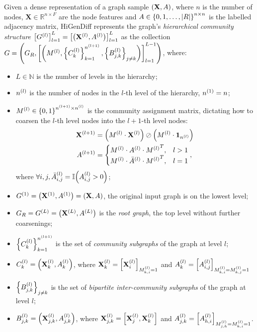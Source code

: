 Given a dense representation of a graph sample $\of{\mathbf{X},A}$, where $n$ is the number of nodes, $\mathbf{X} \in \mathbb{R}^{n \times F}$ are the node features and $A \in \offf{0,1,\dots,\abs{R}}^{n \times n}$ is the labelled adjacency matrix, HiGenDiff represents the graph's \emph{hierarchical community structure} $\off{G^{\of{l}}}_{l=1}^{L}=\off{\of{\mathbf{X}^{\of{l}},A^{\of{l}}}}_{l=1}^{L}$ as the collection $G=\of{G_R,\off{\of{M^{\of{l}}, \offf{C^{\of{l}}_{k}}_{k=1}^{n^{\of{l+1}}},\offf{B^{\of{l}}_{j,k}}_{j \neq k}}}_{l=1}^{L-1}}$, where:
\begin{itemize}
    \item $L \in \mathbb{N}$ is the number of levels in the hierarchy;
    \item $n^{\of{l}}$ is the number of nodes in the $l$-th level of the hierarchy, $n^{\of{1}}=n$;
    \item $M^{\of{l}} \in \offf{0,1}^{n^{\of{l+1}} \times n^{\of{l}}}$ is the community assignment matrix, dictating how to coarsen the $l$-th level nodes into the $l+1$-th level nodes:
    \begin{align}
        \begin{split}
            \mathbf{X}^{\of{l+1}}&=\of{M^{\of{l}} \cdot \mathbf{X}^{\of{l}}} \oslash \of{M^{\of{l}} \cdot \mathbf{1}_{n^{\of{l}}}} \\
            A^{\of{l+1}}&=\begin{cases}
                M^{\of{l}} \cdot A^{\of{l}} \cdot {M^{\of{l}}}^T, & l>1 \\
                M^{\of{l}} \cdot \bar{A}^{\of{l}} \cdot {M^{\of{l}}}^T, & l=1
            \end{cases},
        \end{split}
    \end{align}
    where $\forall i,j, \bar{A}^{\of{l}}_{i,j}=\mathbb{I}\of{A^{\of{l}}_{i,j}>0}$;
    \item $G^{\of{1}}=\of{\mathbf{X}^{\of{1}},A^{\of{1}}}=\of{\mathbf{X},A}$, the original input graph is on the lowest level;
    \item $G_R=G^{\of{L}}=\of{\mathbf{X}^{\of{L}}, A^{\of{L}}}$ is the \emph{root graph}, the top level without further coarsenings;
    \item $\offf{C^{\of{l}}_{k}}_{k=1}^{n^{\of{l+1}}}$ is the set of \emph{community subgraphs} of the graph at level $l$;
    \item $C^{\of{l}}_{k}=\of{\mathbf{X}_k^{\of{l}},A_k^{\of{l}}}$, where $\mathbf{X}_k^{\of{l}}=\off{\mathbf{X}_i^{\of{l}}}_{M^{\of{l}}_{k,i}=1}$ and $A_k^{\of{l}}=\off{A_{i,j}^{\of{l}}}_{M^{\of{l}}_{k,i}=M^{\of{l}}_{k,j}=1}$
    \item $\offf{B^{\of{l}}_{j,k}}_{j \neq k}$ is the set of \emph{bipartite inter-community subgraphs} of the graph at level $l$;
    \item $B^{\of{l}}_{j,k}=\of{\mathbf{X}_{j,k}^{\of{l}},A_{j,k}^{\of{l}}}$, where $\mathbf{X}_{j,k}^{\of{l}}=\off{\mathbf{X}_{j}^{\of{l}},\mathbf{X}_{k}^{\of{l}}}$ and $A_{j,k}^{\of{l}}=\off{A_{h,i}^{\of{l}}}_{M^{\of{l}}_{j,h}=M^{\of{l}}_{k,i}=1}$.
\end{itemize}

